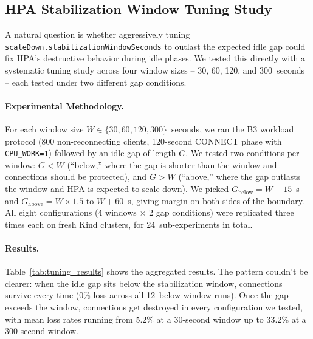 \documentclass[pdflatex,sn-mathphys-num]{sn-jnl}
\theoremstyle{thmstyleone}%
\theoremstyle{thmstyletwo}%
\theoremstyle{thmstylethree}%
\begin{document}
\subsection{HPA Stabilization Window Tuning Study}
\label{sec:tuning_study}

A natural question is whether aggressively tuning
\texttt{scaleDown.stabilizationWindowSeconds} to outlast the expected idle gap
could fix HPA's destructive behavior during idle phases. We tested this directly
with a systematic tuning study across four window sizes -- 30, 60, 120, and
300~seconds -- each tested under two different gap conditions.

\paragraph{Experimental Methodology.}
For each window size $W \in \{30, 60, 120, 300\}$~seconds, we ran the B3 workload
protocol (800 non-reconnecting clients, 120-second CONNECT phase with
\texttt{CPU\_WORK=1}) followed by an idle gap of length $G$. We tested two
conditions per window: $G < W$ (``below,'' where the gap is shorter than the
window and connections should be protected), and $G > W$ (``above,'' where the gap
outlasts the window and HPA is expected to scale down). We picked
$G_{\text{below}} = W - 15$~s and $G_{\text{above}} = W \times 1.5$ to $W + 60$~s,
giving margin on both sides of the boundary. All eight configurations (4 windows
$\times$ 2 gap conditions) were replicated three times each on fresh Kind
clusters, for 24~sub-experiments in total.

\paragraph{Results.}
Table~\ref{tab:tuning_results} shows the aggregated results. The pattern couldn't
be clearer: when the idle gap sits below the stabilization window, connections
survive every time (0\% loss across all 12~below-window runs). Once the gap
exceeds the window, connections get destroyed in every configuration we tested,
with mean loss rates running from 5.2\% at a 30-second window up to 33.2\% at a
300-second window.
\end{document}

